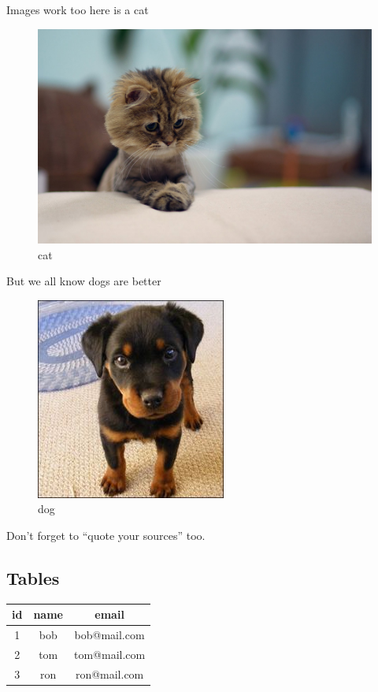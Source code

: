 \documentclass{article}
\begin{document}
Images work too here is a cat \begin{figure}[h]
\caption{cat}
\centering
\includegraphics{cat.jpg}
\end{figure}

But we all know dogs are better

\begin{figure}[h]
\caption{dog}
\centering
\includegraphics{dog}
\end{figure}

Don't forget to ``quote your sources'' too.

\subsection{Tables}

\noindent
\begin{tabular}{| c | c | c |}
\hline 
id
&name
&email
\\
\hline 
1
&bob
&bob@mail.com
\\
\hline 
2
&tom
&tom@mail.com
\\
\hline 
3
&ron
&ron@mail.com
\\
\hline 
\end{tabular}
\end{document}
